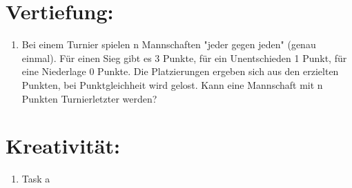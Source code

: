 



    \maketitle
    \section*{Vertiefung:}
    \begin{enumerate}[label=(\alph*)]
        \item Bei einem Turnier spielen n Mannschaften "jeder gegen jeden" (genau einmal). Für einen
		Sieg gibt es 3 Punkte, für ein Unentschieden 1 Punkt, für eine Niederlage 0 Punkte. Die
		Platzierungen ergeben sich aus den erzielten Punkten, bei Punktgleichheit wird gelost.
		Kann eine Mannschaft mit n Punkten Turnierletzter werden?
    \end{enumerate}
    \section*{Kreativität:}
    \begin{enumerate}[label=(\alph*)]
    	\item Task a
    \end{enumerate}

